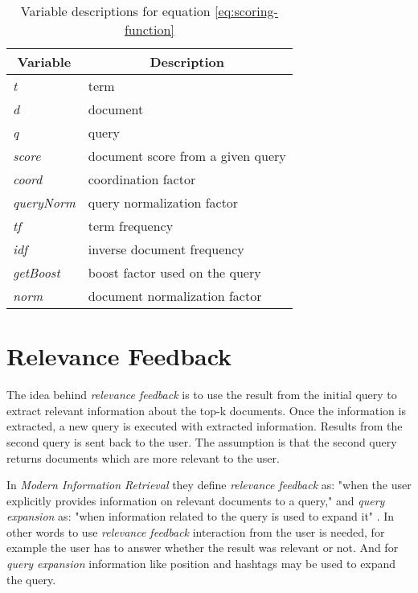 \begin{table}
		\centering
    \begin{tabular}{|l|l|}
    \hline
		\multicolumn{1}{|c|}{\bfseries Variable} & \multicolumn{1}{|c|}{\bfseries Description} \\ \hline
    \textit{t}         & term                           		\\ \hline
    \textit{d}         & document                       		\\ \hline
    \textit{q}         & query                          		\\ \hline
		\textit{score}     & document score from a given query	\\ \hline
    \textit{coord}     & coordination factor            		\\ \hline
    \textit{queryNorm} & query normalization factor     		\\ \hline
    \textit{tf}        & term frequency                 		\\ \hline
    \textit{idf}       & inverse document frequency     		\\ \hline
    \textit{getBoost}  & boost factor used on the query 		\\ \hline
    \textit{norm}      & document normalization factor  		\\ \hline
    \end{tabular}
		\caption{Variable descriptions for equation \ref{eq:scoring-function}}
		\label{tbl:scoring-function}
\end{table}

\section{Relevance Feedback}
The idea behind \textit{relevance feedback} is to use the result from the initial query to extract relevant information about the top-k documents.
Once the information is extracted, a new query is executed with extracted information.
Results from the second query is sent back to the user.
The assumption is that the second query returns documents which are more relevant to the user.

In \textit{Modern Information Retrieval} they define \textit{relevance feedback} as: "when the user explicitly provides information on relevant documents to a query,"
and \textit{query expansion} as: "when information related to the query is used to expand it" \cite[p. 177]{ir-book}.
In other words to use \textit{relevance feedback} interaction from the user is needed, for example the user has to answer whether the result was relevant or not.
And for \textit{query expansion} information like position and hashtags may be used to expand the query.

